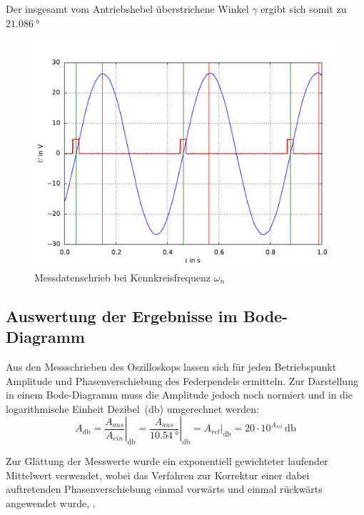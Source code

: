 \documentclass[a4paper,12pt]{scrartcl}
\begin{document}
Der insgesamt vom Antriebshebel überstrichene Winkel $\gamma$ ergibt sich somit zu $\SI{21.086}{\degree}$

\begin{figure}[h]
\centering
\includegraphics[width=\textwidth]{kennkreis.pdf}
\caption{Messdatenschrieb bei Kennkreisfrequenz $\omega_{n}$}
\label{fig:plot-kennkreis}
\end{figure}


\subsection{Auswertung der Ergebnisse im Bode-Diagramm}

Aus den Messschrieben des Oszilloskops lassen sich für jeden Betriebspunkt Amplitude und Phasenverschiebung des Federpendels ermitteln.
Zur Darstellung in einem Bode-Diagramm muss die Amplitude jedoch noch normiert und in die logarithmische Einheit Dezibel~(\si{\decibel}) umgerechnet werden:
\begin{equation}
	A_{\si{\decibel}} = \left.\frac{A_{aus}}{A_{ein}}\right\rvert_{\si{\decibel}}
		= \left.\frac{A_{aus}}{\SI{10.54}{\degree}}\right\rvert_{\si{\decibel}}
		= \left.A_{rel}\right\rvert_{\si{\decibel}}
		= 20 \cdot 10^{A_{rel}} \, \si{\decibel}
\end{equation}

Zur Glättung der Messwerte wurde ein exponentiell gewichteter laufender Mittelwert verwendet, wobei das Verfahren zur Korrektur einer dabei auftretenden Phasenverschiebung einmal vorwärts und einmal rückwärts angewendet wurde, \cite{ewma}.
\end{document}
